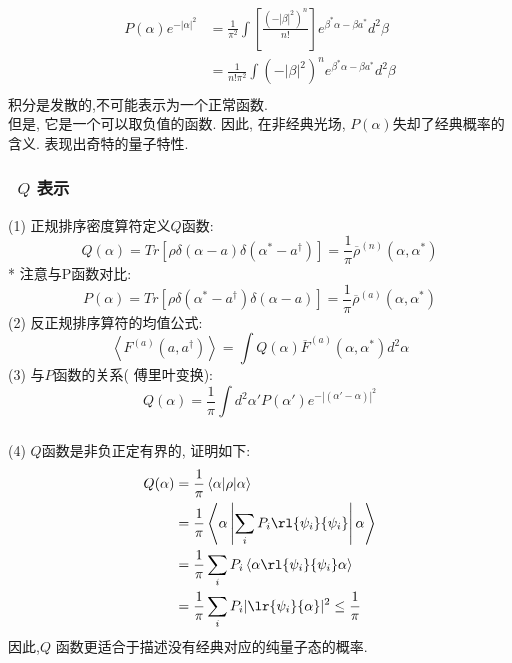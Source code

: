     \begin{frame} 
    \frametitle{}
    \[ \begin{aligned}
      P(\alpha) e^{-\left|\alpha\right|^2}&= \frac{1}{\pi^2}\int [\frac{(- \left|\beta\right|^2)^n}{n!}  ]  e^{\beta^* \alpha - \beta a^*}  d^2 \beta \\ 
    &= \frac{1}{n!\pi^2}\int (- \left|\beta\right|^2)^n    e^{\beta^* \alpha - \beta a^*}  d^2 \beta \\ 
    \end{aligned}\]
    积分是发散的,不可能表示为一个正常函数.\\
    但是, 它是一个可以取负值的函数. 因此, 在非经典光场, $P(\alpha) $失却了经典概率的含义. 表现出奇特的量子特性.
    \end{frame}

    \begin{frame} 
      \frametitle{~$Q$ 表示}
      (1) 正规排序密度算符定义$Q$函数:
      \[ Q(\alpha) = Tr[\rho \delta(\alpha-a)\delta(\alpha^*-a^{\dagger})]=\frac{1}{\pi} \overline{\rho}^{(n)}(\alpha, \alpha^*) \]
      * 注意与P函数对比:
      \[ P(\alpha) = Tr[\rho \delta(\alpha^* -a^{\dagger})\delta(\alpha -a)]=\frac{1}{\pi} \overline{\rho}^{(a)}(\alpha, \alpha^*) \]
      (2) 反正规排序算符的均值公式:
      \[ \left\langle F^{(a)}(a, a^{\dagger}) \right\rangle = \int Q(\alpha) \overline{F}^{(a)} (\alpha, \alpha^{*}) d^2 \alpha\]
      (3) 与$P$函数的关系( 傅里叶变换):
      \[ Q(\alpha) = \frac{1}{\pi} \int  d^2 \alpha' P(\alpha') e^{-\left|(\alpha'-\alpha)\right|^2}\]
    \end{frame}

  \begin{frame} 
  \frametitle{}
      (4) $Q$函数是非负正定有界的, 证明如下:
      \[ \begin{aligned}
      Q(\alpha) &= \frac{1}{\pi} \left\langle \alpha|\rho | \alpha \right\rangle  \\
       &= \frac{1}{\pi} \left\langle \alpha \left| \sum_i P_i \rl{\psi_i} {\psi_i} \right| \alpha \right\rangle \\
       &= \frac{1}{\pi} \sum_i P_i \left\langle \alpha \rl{\psi_i} {\psi_i}\alpha \right\rangle \\ 
       &= \frac{1}{\pi} \sum_i P_i |\lr{\psi_i}{\alpha}|^2
       \leq \frac{1}{\pi}
      \end{aligned}\] 
      因此,$Q$ 函数更适合于描述没有经典对应的纯量子态的概率. 
  \end{frame}


